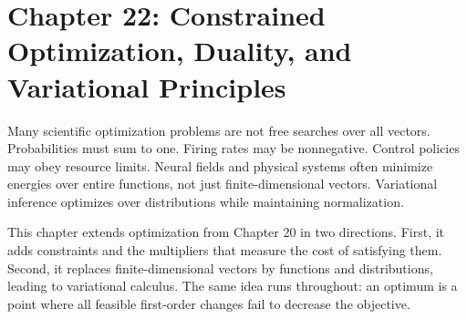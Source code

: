 \section{Chapter 22: Constrained Optimization, Duality, and Variational Principles}
\label{ch:constrained-optimization-duality-variational-principles}

Many scientific optimization problems are not free searches over all vectors. Probabilities must sum to one. Firing rates may be nonnegative. Control policies may obey resource limits. Neural fields and physical systems often minimize energies over entire functions, not just finite-dimensional vectors. Variational inference optimizes over distributions while maintaining normalization.

This chapter extends optimization from Chapter 20 in two directions. First, it adds constraints and the multipliers that measure the cost of satisfying them. Second, it replaces finite-dimensional vectors by functions and distributions, leading to variational calculus. The same idea runs throughout: an optimum is a point where all feasible first-order changes fail to decrease the objective.

